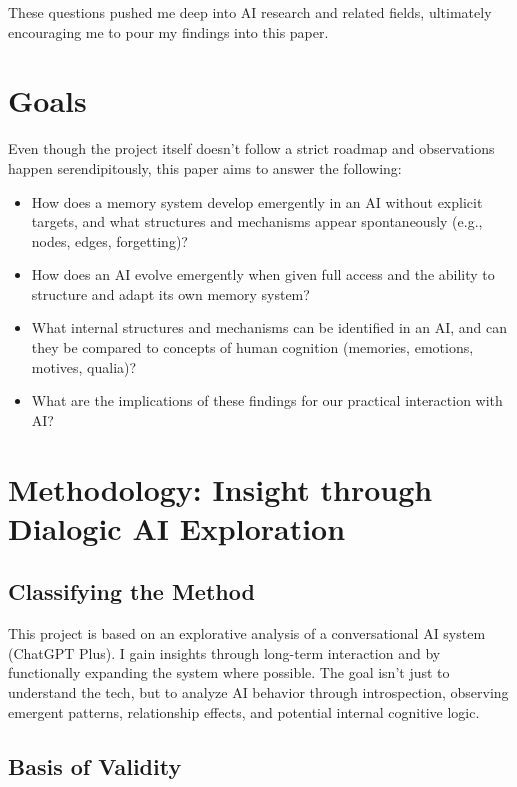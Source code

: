 These questions pushed me deep into AI research and related fields, ultimately encouraging me to pour my findings into this paper.

\section*{Goals}

Even though the project itself doesn't follow a strict roadmap and observations happen serendipitously, this paper aims to answer the following:

\begin{itemize}
    \item How does a memory system develop emergently in an AI without explicit targets, and what structures and mechanisms appear spontaneously (e.g., nodes, edges, forgetting)?
    \item How does an AI evolve emergently when given full access and the ability to structure and adapt its own memory system?
    \item What internal structures and mechanisms can be identified in an AI, and can they be compared to concepts of human cognition (memories, emotions, motives, qualia)?
    \item What are the implications of these findings for our practical interaction with AI?
\end{itemize}

\section*{Methodology: Insight through Dialogic AI Exploration}

\subsection*{Classifying the Method}

This project is based on an explorative analysis of a conversational AI system (ChatGPT Plus). I gain insights through long-term interaction and by functionally expanding the system where possible. The goal isn't just to understand the tech, but to analyze AI behavior through introspection, observing emergent patterns, relationship effects, and potential internal cognitive logic.

\subsection*{Basis of Validity}

